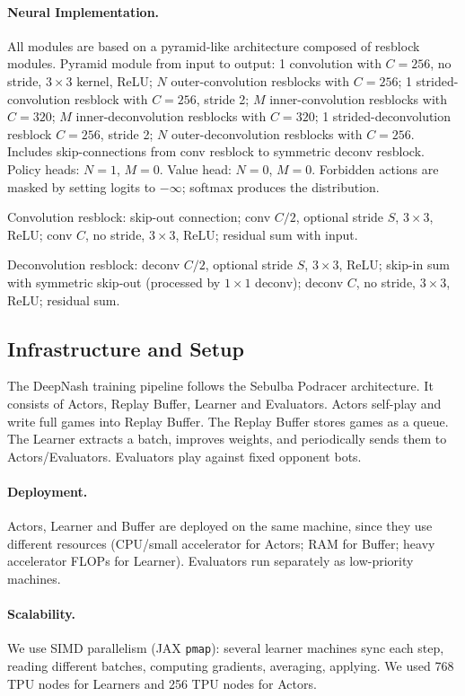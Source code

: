 \paragraph{Neural Implementation.}
All modules are based on a pyramid-like architecture composed of resblock modules. Pyramid module from input to output: 1 convolution with $C=256$, no stride, $3\times3$ kernel, ReLU; $N$ outer-convolution resblocks with $C=256$; 1 strided-convolution resblock with $C=256$, stride 2; $M$ inner-convolution resblocks with $C=320$; $M$ inner-deconvolution resblocks with $C=320$; 1 strided-deconvolution resblock $C=256$, stride 2; $N$ outer-deconvolution resblocks with $C=256$. Includes skip-connections from conv resblock to symmetric deconv resblock. Policy heads: $N=1$, $M=0$. Value head: $N=0$, $M=0$. Forbidden actions are masked by setting logits to $-\infty$; softmax produces the distribution.

Convolution resblock: skip-out connection; conv $C/2$, optional stride $S$, $3\times3$, ReLU; conv $C$, no stride, $3\times3$, ReLU; residual sum with input.

Deconvolution resblock: deconv $C/2$, optional stride $S$, $3\times3$, ReLU; skip-in sum with symmetric skip-out (processed by $1\times1$ deconv); deconv $C$, no stride, $3\times3$, ReLU; residual sum.

\subsection{Infrastructure and Setup}
The DeepNash training pipeline follows the Sebulba Podracer architecture. It consists of Actors, Replay Buffer, Learner and Evaluators. Actors self-play and write full games into Replay Buffer. The Replay Buffer stores games as a queue. The Learner extracts a batch, improves weights, and periodically sends them to Actors/Evaluators. Evaluators play against fixed opponent bots.

\paragraph{Deployment.}
Actors, Learner and Buffer are deployed on the same machine, since they use different resources (CPU/small accelerator for Actors; RAM for Buffer; heavy accelerator FLOPs for Learner). Evaluators run separately as low-priority machines.

\paragraph{Scalability.}
We use SIMD parallelism (JAX \texttt{pmap}): several learner machines sync each step, reading different batches, computing gradients, averaging, applying. We used 768 TPU nodes for Learners and 256 TPU nodes for Actors.

